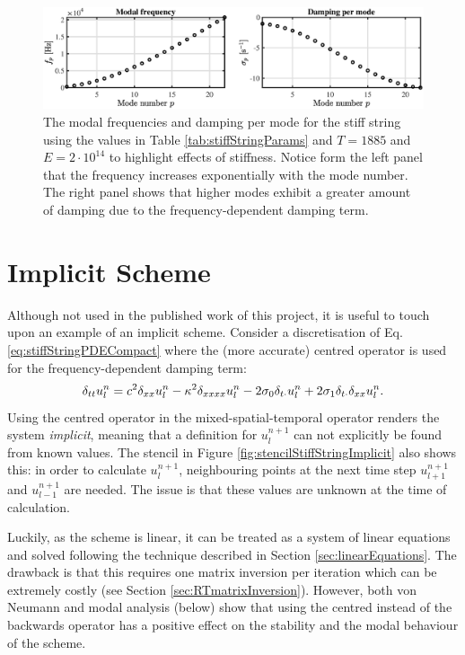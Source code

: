 {\begin{figure}[h]
    \centering
    \includegraphics[width=\textwidth]{figures/resonators/modesStiffString.eps}
    \caption{The modal frequencies and damping per mode for the stiff string using the values in Table \ref{tab:stiffStringParams} and $T = 1885$ and $E = 2\cdot 10^{14}$ to highlight effects of stiffness.  Notice form the left panel that the frequency increases exponentially with the mode number. The right panel shows that higher modes exhibit a greater amount of damping due to the frequency-dependent damping term.\label{fig:modesStiffString}}
\end{figure}

\section{Implicit Scheme}\label{sec:implicitStiffString}
Although not used in the published work of this project, it is useful to touch upon an example of an implicit scheme. Consider a discretisation of Eq. \eqref{eq:stiffStringPDECompact} where the (more accurate) centred operator is used for the frequency-dependent damping term:
\begin{equation}\label{eq:stiffStringFDSImplicit}
    \delta_{tt} u_l^n = c^2 \delta_{xx} u_l^n - \kappa^2 \delta_{xxxx} u_l^n - 2 \sigma_{0} \delta_{t\cdot} u_l^n + 2 \sigma_{1}\delta_{t\cdot}\delta_{xx} u_l^n.
\end{equation}
Using the centred operator in the mixed-spatial-temporal operator renders the system \textit{implicit}, meaning that a definition for $u_l^{n+1}$ can not explicitly be found from known values. The stencil in Figure \ref{fig:stencilStiffStringImplicit} also shows this: in order to calculate $u_l^{n+1}$, neighbouring points at the next time step $u_{l+1}^{n+1}$ and $u_{l-1}^{n+1}$ are needed. The issue is that these values are unknown at the time of calculation.

Luckily, as the scheme is linear, it can be treated as a system of linear equations and solved following the technique described in Section \ref{sec:linearEquations}. The drawback is that this requires one matrix inversion per iteration which can be extremely costly (see Section \ref{sec:RTmatrixInversion}). However, both von Neumann and modal analysis (below) show that using the centred instead of the backwards operator has a positive effect on the stability and the modal behaviour of the scheme. 

}
